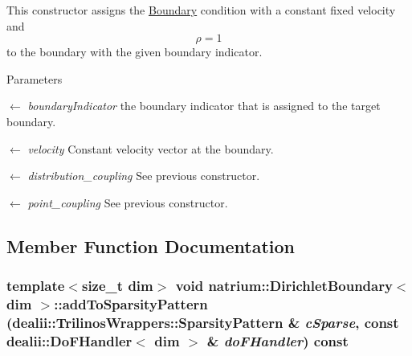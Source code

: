 This constructor assigns the \hyperlink{classnatrium_1_1Boundary}{Boundary} condition with a constant fixed velocity and \[ \rho = 1 \] to the boundary with the given boundary indicator. 
\begin{DoxyParams}{Parameters}
\item[\mbox{$\leftarrow$} {\em boundaryIndicator}]the boundary indicator that is assigned to the target boundary. \item[\mbox{$\leftarrow$} {\em velocity}]Constant velocity vector at the boundary. \item[\mbox{$\leftarrow$} {\em distribution\_\-coupling}]See previous constructor. \item[\mbox{$\leftarrow$} {\em point\_\-coupling}]See previous constructor. \end{DoxyParams}


\subsection{Member Function Documentation}
\hypertarget{classnatrium_1_1DirichletBoundary_a1eaa444c487f30b0a2a284e7d9f4f92e}{
\subsubsection[{addToSparsityPattern}]{\setlength{\rightskip}{0pt plus 5cm}template$<$size\_\-t dim$>$ void {\bf natrium::DirichletBoundary}$<$ dim $>$::addToSparsityPattern (dealii::TrilinosWrappers::SparsityPattern \& {\em cSparse}, \/  const dealii::DoFHandler$<$ dim $>$ \& {\em doFHandler}) const}}
\label{classnatrium_1_1DirichletBoundary_a1eaa444c487f30b0a2a284e7d9f4f92e}


